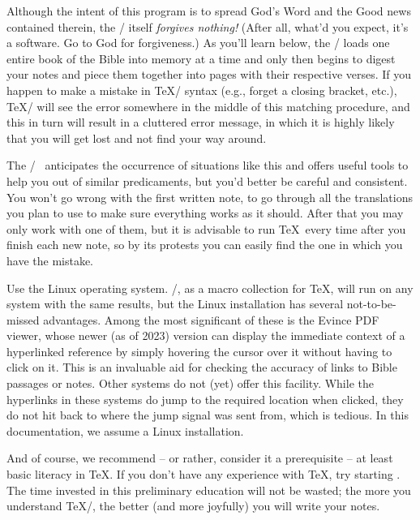 \watchout
Although the intent of this program is to spread God's Word and the Good news contained therein, the 
\OpBible/ itself {\it forgives nothing!} 
(After all, what'd you expect, it's a software. Go to God for forgiveness.) As you'll learn below, 
the \OpBible/ loads one entire book of the Bible into memory at a time and only then  
begins to digest your notes and piece them together into pages with their respective verses. If you 
happen to make a mistake in \TeX/ syntax (e.g., forget a closing bracket, etc.), \TeX/ will see the 
error somewhere in the middle of this matching procedure, and this in turn will result in a 
cluttered error message, in which it is highly likely that you will get lost and not find your way 
around.

The \OpBible/~ anticipates the occurrence of situations like this and offers useful tools to help 
you out of similar predicaments, but you'd better be careful and consistent. You won't go wrong with 
the first written note, to go through all the translations you plan to use to make sure everything 
works as it should.  After that you may only  work with one of them, but it is advisable to run 
\TeX\ every time  after you finish each new note, so by its protests  you can easily find the one 
in which you have the mistake.

\recommended Use the Linux operating system. \OpBible/, as a macro collection for \TeX, will run on any 
system with the same results, but the Linux installation has
several not-to-be-missed advantages. Among the most significant of these is the Evince PDF viewer, 
whose newer (as of 2023) version can display the immediate context of a hyperlinked
reference by simply hovering the cursor over it without having to click on it. This is an invaluable 
aid for checking the accuracy of links to Bible passages or notes.
Other systems do not (yet) offer this facility. While the hyperlinks in these systems do jump to the 
required location when clicked, they do not hit back to where the jump signal was sent from, which 
is tedious. In this documentation, we assume a Linux installation.

And of course, we recommend -- or rather, consider it a prerequisite -- at least basic literacy in 
\TeX.
If you don't have any experience with \TeX, try starting 
. 
The time invested in this preliminary education will not be wasted; the more you understand \TeX/, 
the better (and more joyfully) you will write your notes.

